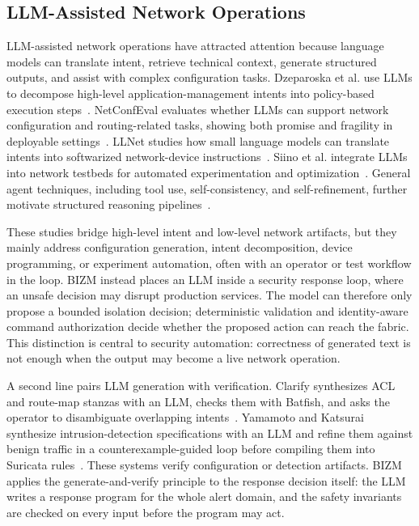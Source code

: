 \documentclass[final,5p]{elsarticle}
\begin{document}
\subsection{LLM-Assisted Network Operations}
\label{sec:rw_llm_agent}

LLM-assisted network operations have attracted attention because language models can translate intent, retrieve technical context, generate structured outputs, and assist with complex configuration tasks. Dzeparoska et al. use LLMs to decompose high-level application-management intents into policy-based execution steps~\cite{dzeparoska2023llmpolicy}. NetConfEval evaluates whether LLMs can support network configuration and routing-related tasks, showing both promise and fragility in deployable settings~\cite{wang2024netconfeval}. LLNet studies how small language models can translate intents into softwarized network-device instructions~\cite{angi2025llnet}. Siino et al. integrate LLMs into network testbeds for automated experimentation and optimization~\cite{siino2025llmtestbed}. General agent techniques, including tool use, self-consistency, and self-refinement, further motivate structured reasoning pipelines~\cite{schick2023toolformer,wang2023selfconsistency,madaan2023selfrefine,liu2023trustworthyllm}.

These studies bridge high-level intent and low-level network artifacts, but they mainly address configuration generation, intent decomposition, device programming, or experiment automation, often with an operator or test workflow in the loop. BIZM instead places an LLM inside a security response loop, where an unsafe decision may disrupt production services. The model can therefore only propose a bounded isolation decision; deterministic validation and identity-aware command authorization decide whether the proposed action can reach the fabric. This distinction is central to security automation: correctness of generated text is not enough when the output may become a live network operation.

A second line pairs LLM generation with verification. Clarify synthesizes ACL and route-map stanzas with an LLM, checks them with Batfish, and asks the operator to disambiguate overlapping intents~\cite{mondal2025clarify}. Yamamoto and Katsurai synthesize intrusion-detection specifications with an LLM and refine them against benign traffic in a counterexample-guided loop before compiling them into Suricata rules~\cite{yamamoto2026verification}. These systems verify configuration or detection artifacts. BIZM applies the generate-and-verify principle to the response decision itself: the LLM writes a response program for the whole alert domain, and the safety invariants are checked on every input before the program may act.
\end{document}
